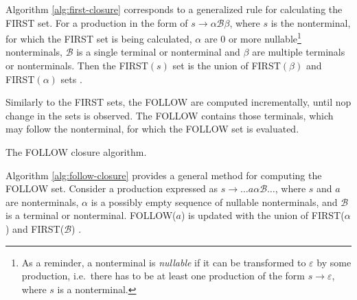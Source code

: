 Algorithm \ref{alg:first-closure} corresponds to a generalized rule for calculating the FIRST set. For a production in the form of $s \rightarrow \alpha \mathcal{B} \beta$, where $s$ is the nonterminal, for which the FIRST set is being calculated, $\alpha$ are 0 or more nullable\footnote{As a reminder, a nonterminal is \emph{nullable} if it can be transformed to $\varepsilon$ by some production, i.e.\ there has to be at least one production of the form $s \rightarrow \varepsilon$, where $s$ is a nonterminal.} nonterminals, $\mathcal{B}$ is a single terminal or nonterminal and $\beta$ are multiple terminals or nonterminals. Then the FIRST$(s)$ set is the union of FIRST$(\beta)$ and FIRST$(\alpha)$ sets \cite[Chapter~4.7.1]{Holub_1990}.


Similarly to the FIRST sets, the FOLLOW are computed incrementally, until nop change in the sets is observed. The FOLLOW contains those terminals, which may follow the nonterminal, for which the FOLLOW set is evaluated. 

\begingroup
\vspace{1.5em}
\begin{algorithm}[H]
  \setlength{\algomargin}{1.5em}

  \caption{The FOLLOW closure algorithm.}
  \label{alg:follow-closure}
\end{algorithm}
\vspace{1.5em}
\endgroup
Algorithm \ref{alg:follow-closure} provides a general method for computing the FOLLOW set. Consider a production expressed as $s \rightarrow \dots a \alpha \mathcal{B}\dots$, where $s$ and $a$ are nonterminals, $\alpha$ is a possibly empty sequence of nullable nonterminals, and $\mathcal{B}$ is a terminal or nonterminal. FOLLOW($a$) is updated with the union of FIRST($\alpha$) and FIRST($\mathcal{B}$) \cite[Chapter~4.7.2]{Holub_1990}.

